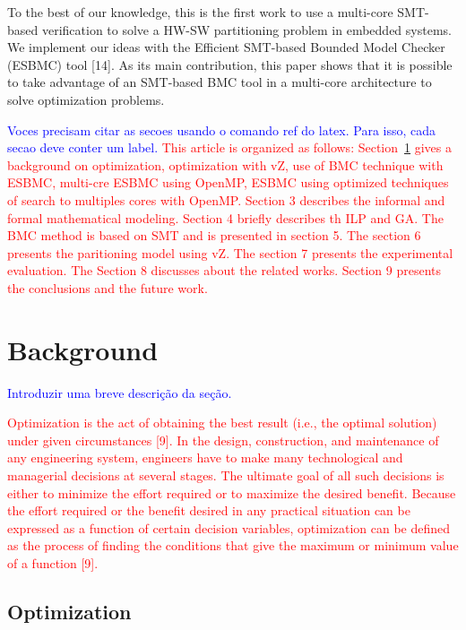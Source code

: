 To the best of our knowledge, this is the first work to use a multi-core SMT-based verification to solve a HW-SW partitioning problem in embedded systems. We implement our ideas with the Efficient SMT-based Bounded Model Checker (ESBMC) tool [14]. As its main contribution, this paper shows that it is possible to take advantage of an SMT-based BMC tool in a multi-core architecture to solve optimization problems.

\textcolor{blue}{Voces precisam citar as secoes usando o comando ref do latex. Para isso, cada secao deve conter um label.}
\textcolor{Red}{This article is organized as follows: Section~\ref{background} gives a background on optimization, optimization with vZ, use of BMC technique with ESBMC, multi-cre ESBMC using OpenMP, ESBMC using optimized techniques of search to multiples cores with OpenMP. Section 3 describes the informal and formal mathematical modeling. Section 4 briefly describes th ILP and GA. The BMC method is based on SMT and is presented in section 5. The section 6 presents the paritioning model using vZ. The section 7 presents the experimental evaluation. The Section 8 discusses about the related works. Section 9 presents the conclusions and the future work.}

\section{Background}
\label{background}

\textcolor{blue}{Introduzir uma breve descrição da seção.}

\textcolor{red}{Optimization is the act of obtaining the best result (i.e., the optimal solution) under given circumstances [9]. In the design, construction, and maintenance of any engineering system, engineers have to make many technological and managerial decisions at several stages. The ultimate goal of all such decisions is either to minimize the effort required or to maximize the desired benefit. Because the effort required or the benefit desired in any practical situation can be expressed as a function of certain decision variables, optimization can be defined as the process of finding the conditions that give the maximum or minimum value of a function [9].}
\subsection{Optimization}

